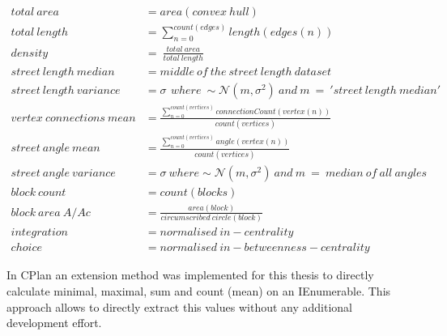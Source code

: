 \begin{align}
    total\ area &= area(convex\ hull)  \\
    total\ length &= \sum_{n=0}^{count(edges)} length(edges(n))\  \\
    density &=\ \frac{total\ area}{total\ length} \\
    street\ length\ median &=  middle\ of\ the\ street\ length\ dataset \\
    street\ length\ variance &= \sigma\,\ where\ \sim\mathcal{N}(m,\sigma^2)\ and\ m\ =\ 'street\ length\ median' \\
    vertex\ connections\ mean &= \frac{\sum_{n=0}^{count(vertices)} connectionCount(vertex(n))}{count(vertices)} \\
    street\ angle\ mean &= \frac{\sum_{n=0}^{count(vertices)} angle(vertex(n))}{count(vertices)} \\
    street\ angle\ variance &= \sigma\ where \sim\mathcal{N}(m,\sigma^2)\ and\ m\ =\ median\ of\ all\ angles \\
    block\ count &= count(blocks) \\
    block\ area\ A/Ac &= \frac{area(block)}{circumscribed\ circle(block)} \\
    integration &= normalised\ in-centrality \\
    choice &= normalised\ in-betweenness-centrality 
\end{align}

In CPlan an extension method was implemented for this thesis to directly calculate minimal, maximal, sum and count (mean) on an IEnumerable. This approach allows to directly extract this values without any additional development effort. 
